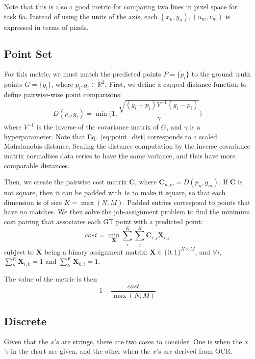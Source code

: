 \documentclass[a4paper,11pt]{scrartcl}
\begin{document}
Note that this is also a good metric for comparing two lines in pixel space for task 6a.
Instead of using the units of the axis, each $(x_n, y_n), (u_m, v_m)$ is expressed in terms of pixels.

\subsection{Point Set}

For this metric, we must match the predicted points $P = \{p_i\}$ to the ground truth points $G = \{g_i\}$, where $p_i, g_i \in \mathbb{R}^2$.
First, we define a capped distance function to define pairwise-wise point comparisons:
\begin{equation} \label{eq:point_dist}
D(p_i, g_i) = \min \Big(1, \frac{\sqrt{(g_i - p_i)V^{-1}(g_i - p_i)}}{\gamma} \Big)
\end{equation}
where $V^{-1}$ is the inverse of the covariance matrix of $G$, and $\gamma$ is a hyperparameter.
Note that Eq.~\ref{eq:point_dist} corresponds to a scaled Mahalanobis distance.
Scaling the distance computation by the inverse covariance matrix normalizes data series to have the same variance, and thus have more comparable distances.

Then, we create the pairwise cost matrix $\mathbf{C}$, where $\mathbf{C}_{n,m} = D(p_n,g_m)$.
If $\mathbf{C}$ is not square, then it can be padded with $1$s to make it square, so that each dimension is of size $K = \max(N,M)$.
Padded entries correspond to points that have no matches.
We then solve the job-assignment problem to find the minimum cost pairing that associates each GT point with a predicted point:
\begin{equation} \label{eq:assign}
cost = \min_{\mathbf{X}} \sum_i^K \sum_j^K \mathbf{C}_{i,j} \mathbf{X}_{i,j}
\end{equation}
subject to $\mathbf{X}$ being a binary assignment matrix: $\mathbf{X} \in \{0,1\}^{N \times M}$, and $\forall i$, $\sum_k^K \mathbf{X}_{i,k} = 1$ and $\sum_k^K \mathbf{X}_{k,i} = 1$.

The value of the metric is then 
\begin{equation} \label{eq:assign_cost}
1 - \frac{cost}{\max(N,M)}
\end{equation}


\subsection{Discrete}

Given that the $x$'s are strings, there are two cases to consider.
One is when the $x$'s in the chart are given, and the other when the $x$'s are derived from OCR.
\end{document}

